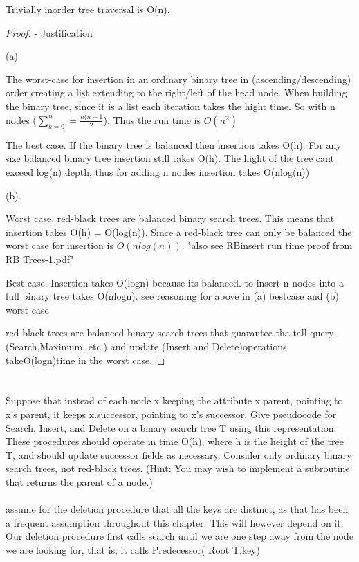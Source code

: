 \documentclass[12pt]{article}
\begin{document}
Trivially inorder tree traversal is O(n). 

 	\begin{proof}  -  Justification 
 
 	(a)	
 	
The worst-case for insertion in an ordinary binary tree in (ascending/descending) order creating a list extending to the right/left of the head node. When building the binary tree, since it is a list each iteration takes the hight time. So with n nodes $(\sum_{k=0}^n = \frac{n(n+1}{2}$). Thus the run time is $O(n^2)$
 	
 	The best case. If the binary tree is balanced then insertion takes O(h). For any size balanced binary tree insertion still takes O(h). The hight of the tree cant exceed log(n) depth, thus for adding n nodes insertion takes O(nlog(n))
 	
	(b). 
	
	Worst case. red-black trees are balanced binary search trees. This means that insertion takes O(h) = O(log(n)). Since a red-black tree can only be balanced the worst case for insertion is $O(nlog(n))$. 
	"also see RBinsert run time proof from RB Trees-1.pdf"
	
	Best case. Insertion takes O(logn) because its balanced. to insert n nodes into a full binary tree takes O(nlogn). 
	see reasoning for above in (a) bestcase and (b) worst case
	
	red-black trees are balanced binary search trees that guarantee tha tall query (Search,Maximum, etc.)  and update (Insert and Delete)operations takeO(logn)time in the worst case.
 
 	\end{proof}
 
 	\section{}
 Suppose that instead of each node x keeping the attribute x.parent, pointing to x’s parent, it keeps x.successor, pointing to x’s successor. Give pseudocode for Search, Insert, and Delete on a binary search tree T using this representation. These procedures should operate in time O(h), where h is the height of the tree T, and should update successor fields as necessary. Consider only ordinary binary search trees, not red-black trees. (Hint:
You may wish to implement a subroutine that returns the parent of a node.)\\\\

assume for the deletion procedure that all the keys are distinct, as
that has been a frequent assumption throughout this chapter. This will however
depend on it. Our deletion procedure first calls search until we are one step away
from the node we are looking for, that is, it calls Predecessor( Root T,key)
\end{document}
